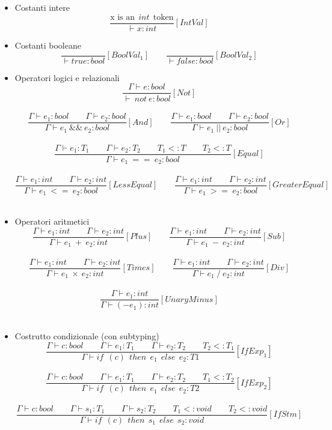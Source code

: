 \documentclass[a4paper]{article}   %
\begin{document}
\begin{itemize}
  \item Costanti intere
  $$ \frac{\text{x \ \ is \ \ an} \ \ int \ \ \text{token}}{\vdash x : int}[IntVal] $$
  
  \item Costanti booleane
  $$ \frac{}{\vdash true : bool}[BoolVal_1] \qquad \frac{}{\vdash false : bool}[BoolVal_2] $$
  
  \item Operatori logici e relazionali
  $$ \frac{\Gamma\vdash e : bool}{\vdash\ not\ e : bool}[Not] $$\\
  $$ \frac{\Gamma \vdash e_1 : bool \qquad \Gamma \vdash e_2 : bool}{\Gamma \vdash e_1 \ \&\& \ e_2 : bool}[And] \qquad \frac{\Gamma \vdash e_1 : bool \qquad \Gamma \vdash e_2 : bool}{\Gamma \vdash e_1 \ || \ e_2 : bool}[Or] $$\\
  $$ \frac{\Gamma \vdash e_1 : T_1 \qquad \Gamma \vdash e_2 : T_2 \qquad T_1 <: T \qquad T_2<:T}{\Gamma \vdash e_1 \ == \ e_2 : bool}[Equal] $$\\
  $$ \frac{\Gamma \vdash e_1 : int \qquad \Gamma \vdash e_2 : int}{\Gamma \vdash e_1 \ <= \ e_2 : bool}[LessEqual] \qquad \frac{\Gamma \vdash e_1 : int \qquad \Gamma \vdash e_2 : int}{\Gamma \vdash e_1 \ >= \ e_2 : bool}[GreaterEqual] $$\\

  \item Operatori aritmetici
  $$ \frac{\Gamma \vdash e_1 : int \qquad \Gamma \vdash e_2 : int}{\Gamma \vdash e_1 \ + \ e_2 : int}[Plus] \qquad \frac{\Gamma \vdash e_1 : int \qquad \Gamma \vdash e_2 : int}{\Gamma \vdash e_1 \ - \ e_2 : int}[Sub] $$\\
  $$ \frac{\Gamma \vdash e_1 : int \qquad \Gamma \vdash e_2 : int}{\Gamma \vdash e_1 \ \times \ e_2 : int}[Times] \qquad \frac{\Gamma \vdash e_1 : int \qquad \Gamma \vdash e_2 : int}{\Gamma \vdash e_1 \ / \ e_2 : int}[Div] $$\\
  $$ \frac{\Gamma \vdash e_1 : int}{\Gamma \vdash (- e_1) : int}[UnaryMinus] $$\\
  
  \item Costrutto condizionale (con subtyping)
  $$ \frac{\Gamma \vdash c : bool \qquad \Gamma \vdash e_1 : T_1 \qquad \Gamma \vdash e_2 : T_2 \qquad T_2 <: T_1}{\Gamma \vdash if \ \ (c) \ \ then \ \ {e_1} \ \ else \ \ {e_2} : T1}[IfExp_1] $$\\
  $$ \frac{\Gamma \vdash c : bool \qquad \Gamma \vdash e_1 : T_1 \qquad \Gamma \vdash e_2 : T_2 \qquad T_1 <: T_2}{\Gamma \vdash if \ \ (c) \ \ then \ \ {e_1} \ \ else \ \ {e_2} : T2}[IfExp_2] $$\\
  $$ \frac{\Gamma \vdash c : bool \qquad \Gamma \vdash s_1 : T_1 \qquad \Gamma \vdash s_2 : T_2 \qquad T_1 <: void \qquad T_2 <: void}{\Gamma \vdash if \ \ (c) \ \ then \ \ {s_1} \ \ else \ \ {s_2} : void}[IfStm] $$\\


\end{itemize}
\end{document}
